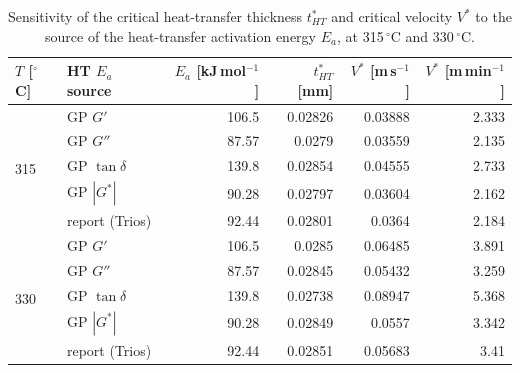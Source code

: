 \begin{table}[htbp]
\centering
\caption{Sensitivity of the critical heat-transfer thickness $t_{HT}^*$ and critical velocity $V^*$ to the source of the heat-transfer activation energy $E_a$, at 315\,$^\circ$C and 330\,$^\circ$C.}
\label{tab:ht-sensitivity}
\begin{tabular}{llrrrr}
\toprule
$T$ [$^\circ$C] & HT $E_a$ source & $E_a$ [kJ\,mol$^{-1}$] & $t_{HT}^*$ [mm] & $V^*$ [m\,s$^{-1}$] & $V^*$ [m\,min$^{-1}$] \\
\midrule
\multirow[t]{5}{*}{315} & GP $G'$ & 106.5 & 0.02826 & 0.03888 & 2.333 \\
 & GP $G''$ & 87.57 & 0.0279 & 0.03559 & 2.135 \\
 & GP $\tan\delta$ & 139.8 & 0.02854 & 0.04555 & 2.733 \\
 & GP $|G^*|$ & 90.28 & 0.02797 & 0.03604 & 2.162 \\
 & report (Trios) & 92.44 & 0.02801 & 0.0364 & 2.184 \\
\midrule
\multirow[t]{5}{*}{330} & GP $G'$ & 106.5 & 0.0285 & 0.06485 & 3.891 \\
 & GP $G''$ & 87.57 & 0.02845 & 0.05432 & 3.259 \\
 & GP $\tan\delta$ & 139.8 & 0.02738 & 0.08947 & 5.368 \\
 & GP $|G^*|$ & 90.28 & 0.02849 & 0.0557 & 3.342 \\
 & report (Trios) & 92.44 & 0.02851 & 0.05683 & 3.41 \\
\bottomrule
\end{tabular}
\end{table}
